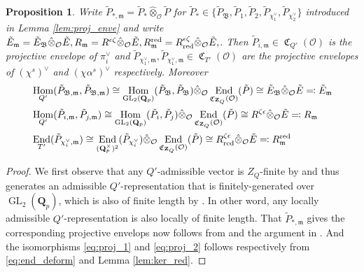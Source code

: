 \documentclass[leqno]{amsart}
\newtheorem{prop}[thm]{Proposition}
\theoremstyle{definition}
\theoremstyle{remark}
\newcommand{\oo}{\mathcal{O}}
\newcommand{\Z}{{\mathbf{Z}}}
\newcommand{\Qp}{\mathbf{Q}_p}
\DeclareMathOperator{\End}{End}
\DeclareMathOperator{\Hom}{Hom}
\DeclareMathOperator{\GL}{GL}
\newcommand{\fm}{\mathfrak{m}}
\DeclareMathOperator{\fC}{\mathfrak{C}} %
\newcommand{\B}{\mathfrak B} %
\newcommand{\red}{\textnormal{red}}
\begin{document}
\begin{prop}\label{prop:envelope}
    Write $\tilde{P}_{*,\fm}=
    \tilde{P}_*\hat{\otimes}_{\oo}\tilde{P}$
    for $\tilde{P}_*\in\{\tilde{P}_\B, \tilde{P}_1, \tilde{P}_2,
    \tilde{P}_{\chi_1^\vee}, \tilde{P}_{\chi_2^\vee}\}$
    introduced in Lemma \ref{lem:proj_enve}
	and write 
    $\tilde{E}_{\fm}=\tilde{E}_\B
	\hat{\otimes}_{\oo}\tilde{E},
    R_{\fm}=R^{\epsilon\zeta}
	\hat{\otimes}_{\oo}\tilde{E},
    R_{\fm}^\red=R^{\epsilon\zeta}_\red
	\hat{\otimes}_{\oo}\tilde{E},$.
	Then $\tilde{P}_{i,\fm}\in \fC_{Q'}(\oo)$
	is the projective envelope of $\pi_i^\vee$ and 
	$\tilde{P}_{\chi_1^\vee,\fm}, \tilde{P}_{\chi_1^\vee,\fm}
    \in \fC_{T'}(\oo)$ are the projective envelopes
	of $(\chi^s)^\vee$ and
    $(\chi\alpha^s)^\vee$ respectively.
    Moreover
    \begin{align}\label{eq:proj_0}
    &\Hom_{Q'}(\tilde{P}_{\B,\fm}, \tilde{P}_{\B,\fm}) \cong 
    \Hom_{\GL_2(\Qp)}(\tilde{P}_\B, \tilde{P}_\B)
    \hat{\otimes}_\oo \End_{\fC_{\Z_Q}(\oo)}(\tilde{P})\cong 
    \tilde{E}_\B \hat{\otimes}_\oo \tilde{E}
    \eqqcolon \tilde{E}_\fm\\\label{eq:proj_1}
    &\Hom_{Q'}(\tilde{P}_{i,\fm}, \tilde{P}_{j,\fm}) \cong 
    \Hom_{\GL_2(\Qp)}(\tilde{P}_{i}, \tilde{P}_{j})
    \hat{\otimes}_\oo \End_{\fC_{\Z_Q}(\oo)}(\tilde{P})\cong 
    R^{\zeta\epsilon} \hat{\otimes}_\oo \tilde{E}
    \eqqcolon R_\fm\\\label{eq:proj_2}
    &\End_{T'}(\tilde{P}_{\chi_i^\vee,\fm}) \cong 
    \End_{(\Qp^\times)^2}(\tilde{P}_{\chi_i^\vee})
    \hat{\otimes}_\oo \End_{\fC_{\Z_Q}(\oo)}(\tilde{P})\cong 
    R^{\zeta\epsilon}_\red \hat{\otimes}_\oo \tilde{E}
    \eqqcolon R_\fm^{\red}
    \end{align}
\end{prop}
\begin{proof}
    We first observe that any $Q'$-admissible vector 
	is $Z_Q$-finite by \cite[Lem 2.3.5]{emeI}
    and thus generates an admissible $Q'$-representation
    that is finitely-generated over $\GL_2(\Qp)$,
	which is also of finite length by \cite[Thm 2.3.8]{emeI}.
	In other word,
	any locally admissible $Q'$-representation 
	is also locally of finite length.
    That $\tilde{P}_{*,\fm}$ gives
    the corresponding projective envelops now follows from 
    \cite[Lem B.6]{GN}
	and the argument in \cite[Lem B.8]{GN}.
    And the isomorphisms 
    \eqref{eq:proj_1} and
    \eqref{eq:proj_2} follows respectively from  
    \eqref{eq:end_deform} and 
    Lemma \eqref{lem:ker_red}.
\end{proof}
\end{document}
